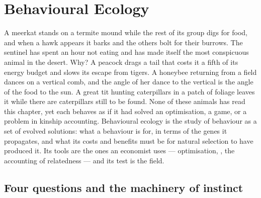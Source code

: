\chapter{Behavioural Ecology}\label{ch:b3:behavioural-ecology}

A meerkat stands on a termite mound while the rest of its group digs
for food, and when a hawk appears it barks and the others bolt for
their burrows. The sentinel has spent an hour not eating and has made
itself the most conspicuous animal in the desert. Why? A peacock drags
a tail that costs it a fifth of its energy budget and slows its escape
from tigers. A honeybee returning from a field dances on a vertical
comb, and the angle of her dance to the vertical is the angle of the
food to the sun. A great tit hunting caterpillars in a patch of foliage
leaves it while there are caterpillars still to be found. None of these
animals has read this chapter, yet each behaves as if it had solved an
optimisation, a game, or a problem in kinship accounting. Behavioural
ecology is the study of behaviour as a set of evolved solutions:
what a behaviour is for, in terms of the genes it propagates, and what
its costs and benefits must be for natural selection to have produced
it. Its tools are the ones an economist uses --- optimisation, , the accounting of relatedness --- and its test is the field.

\section{Four questions and the machinery of instinct}

